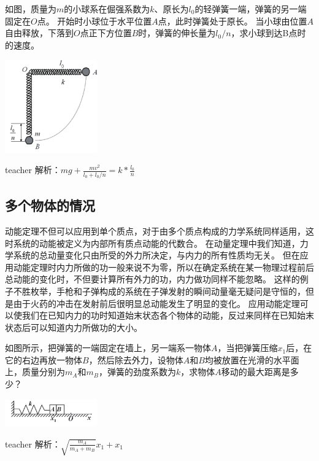 \begin{example}
如图，质量为$m$的小球系在倔强系数为$k$、原长为$l_0$的轻弹簧一端，弹簧的另一端固定在$O$点。
开始时小球位于水平位置$A$点，此时弹簧处于原长。
当小球由位置$A$自由释放，下落到$O$点正下方位置$B$时，弹簧的伸长量为$l_0/n$，求小球到达B点时的速度。
	\begin{flushright}
		\includegraphics[width = 0.3\textwidth]{images/momentum-7.pdf} 
	\end{flushright}
\begin{taggedblock}{teacher}
\noindent
解析：$mg+\frac{mv^2}{l_0+l_0/n}=k*\frac{l_0}{n}$
\end{taggedblock}
\end{example}

\subsection{多个物体的情况}
动能定理不但可以应用到单个质点，对于由多个质点构成的力学系统同样适用，这时系统的动能被定义为内部所有质点动能的代数合。
在动量定理中我们知道，力学系统的总动量变化只由所受的外力所决定，与内力的所有性质均无关。
但在应用动能定理时内力所做的功一般来说不为零，所以在确定系统在某一物理过程前后总动能的变化时，不但要计算所有外力的功，内力做功同样不能忽略。
这样的例子不胜枚举，手枪和子弹构成的系统在子弹发射的瞬间动量毫无疑问是守恒的，但是由于火药的冲击在发射前后很明显总动能发生了明显的变化。
应用动能定理可以使我们在已知内力的功时知道始末状态各个物体的动能，反过来同样在已知始末状态后可以知道内力所做功的大小。

\begin{example}

如图所示，把弹簧的一端固定在墙上，另一端系一物体$A$，当把弹簧压缩$x_1$后，在它的右边再放一物体$B$，然后除去外力，设物体$A$和$B$均被放置在光滑的水平面上，质量分别为$m_A$和$m_B$，弹簧的劲度系数为$k$，求物体$A$移动的最大距离是多少？
	\begin{flushright}
		\includegraphics[width = 0.3\textwidth]{images/momentum-8.pdf} 
	\end{flushright}
\begin{taggedblock}{teacher}
\noindent
解析：$\sqrt{\frac{m_A}{m_A+m_B}}x_1+x_1$
\end{taggedblock}
\end{example}

